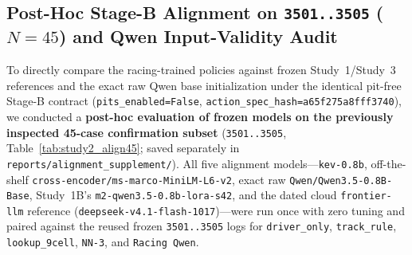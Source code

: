 \documentclass[11pt,a4paper]{article}
\begin{document}
\subsection{Post-Hoc Stage-B Alignment on \texttt{3501..3505} (\texorpdfstring{$N=45$}{N=45}) and Qwen Input-Validity Audit}

To directly compare the racing-trained policies against frozen Study~1/Study~3 references and the exact raw Qwen base initialization under the identical pit-free Stage-B contract (\texttt{pits\_enabled=False}, \nolinkurl{action_spec_hash=a65f275a8fff3740}), we conducted a \textbf{post-hoc evaluation of frozen models on the previously inspected 45-case confirmation subset} (\texttt{3501..3505}, Table~\ref{tab:study2_align45}; saved separately in \texttt{reports/alignment\_supplement/}). All five alignment models---\texttt{kev-0.8b}, off-the-shelf \nolinkurl{cross-encoder/ms-marco-MiniLM-L6-v2}, exact raw \texttt{Qwen/Qwen3.5-0.8B-Base}, Study~1B's \texttt{m2-qwen3.5-0.8b-lora-s42}, and the dated cloud \texttt{frontier-llm} reference (\texttt{deepseek-v4.1-flash-1017})---were run once with zero tuning and paired against the reused frozen \texttt{3501..3505} logs for \texttt{driver\_only}, \texttt{track\_rule}, \texttt{lookup\_9cell}, \texttt{NN-3}, and \texttt{Racing Qwen}.
\end{document}
